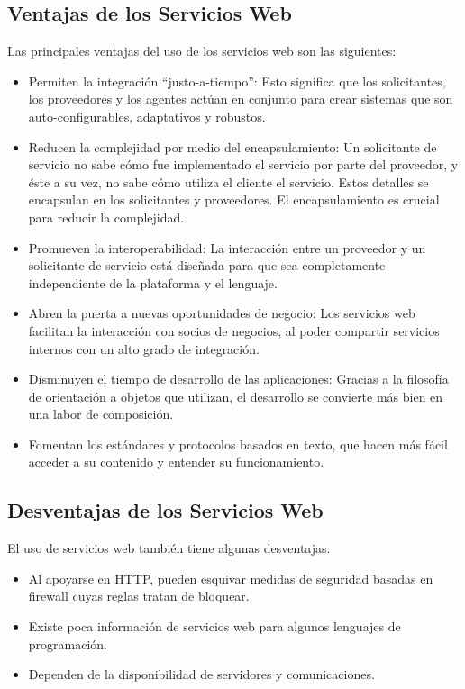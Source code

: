\subsection{Ventajas de los  Servicios Web}
\label{cap:subsec:ventajasserviciosweb}
	Las principales ventajas del uso de los servicios web son las siguientes:
\begin{itemize}
	\item Permiten la integración “justo-a-tiempo”:  Esto significa que los solicitantes, los proveedores y los agentes actúan en conjunto para crear sistemas que son auto-configurables, adaptativos y robustos.
	\item Reducen la complejidad por medio del encapsulamiento: Un solicitante de servicio no sabe cómo fue implementado el servicio por parte del proveedor, y éste a su vez, no sabe cómo utiliza el cliente el servicio. Estos detalles se encapsulan en los solicitantes y proveedores. El encapsulamiento es crucial para reducir la complejidad.
	\item Promueven la interoperabilidad: La interacción entre un proveedor y un solicitante de servicio está diseñada para que sea completamente independiente de la plataforma y el lenguaje. 
	\item Abren la puerta a nuevas oportunidades de negocio: Los servicios web facilitan la interacción con socios de negocios, al poder compartir servicios internos con un alto grado de integración.
	\item Disminuyen el tiempo de desarrollo de las aplicaciones: Gracias a la filosofía de orientación a objetos que utilizan, el desarrollo se convierte más bien en una labor de composición.
	\item Fomentan los estándares y protocolos basados en texto, que hacen más fácil acceder a su contenido y entender su funcionamiento.
\end{itemize}

\subsection{Desventajas de los  Servicios Web}
\label{cap:subsec:desventajasserviciosweb}
	El uso de servicios web también tiene algunas desventajas:
\begin{itemize}
	\item Al apoyarse en HTTP, pueden esquivar medidas de seguridad basadas en firewall cuyas reglas tratan de bloquear.
	\item Existe poca información de servicios web para algunos lenguajes de programación.
	\item Dependen de la disponibilidad de servidores y comunicaciones.
\end{itemize}




